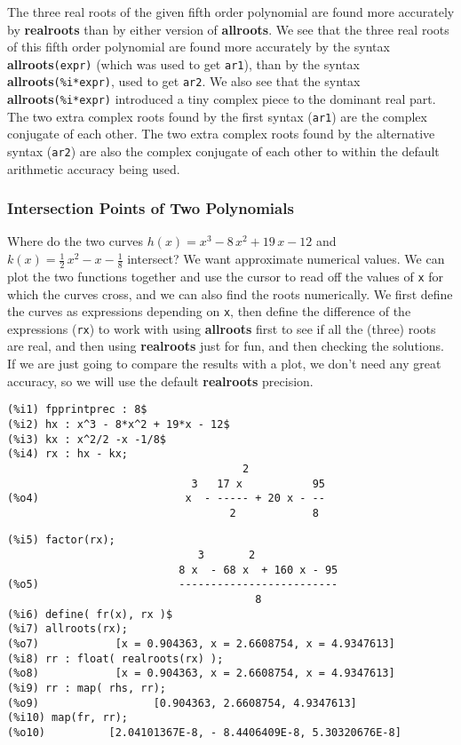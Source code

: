 \documentclass[12pt]{article}
\begin{document}
\normalsize
The three real roots of the given fifth order polynomial are
  found more accurately by \textbf{realroots} than by either
  version of \textbf{allroots}.
We see that the three real roots of this fifth order polynomial are found
  more accurately by the syntax \textbf{allroots}\verb|(expr)|  (which was used
  to get \verb|ar1|), than by the syntax \textbf{allroots}\verb|(%i*expr)|,
  used to get \verb|ar2|.
We also see that the syntax \textbf{allroots}\verb|(%i*expr)| introduced
  a tiny complex piece to the dominant real part.
The two extra complex roots found by the first syntax (\verb|ar1|) are the complex
 conjugate of each other.  
The two extra complex roots found by the alternative syntax (\verb|ar2|) are also
  the complex conjugate of each other to within the default arithmetic accuracy
  being used.
\subsubsection{Intersection Points of Two Polynomials}
Where do the two curves $h(x)=x^3-8\, x^2 + 19\, x -12$ and
  $k(x)=\frac{1}{2}\, x^2 -x - \frac{1}{8}$ intersect?
We want approximate numerical values.
We can plot the two functions together and use the cursor to read off the
  values of \verb|x| for which the curves cross, and we can also find the
  roots numerically.
We first define the curves as expressions depending on \verb|x|, then
  define the difference of the expressions (\verb|rx|) to work with using \textbf{allroots}
  first to see if all the (three) roots are real, and then using \textbf{realroots}
  just for fun, and then checking the solutions.  
If we are just going to compare the results with a plot, we don't need
  any great accuracy, so we will use the default \textbf{realroots} precision.
\small
\begin{verbatim}
(%i1) fpprintprec : 8$
(%i2) hx : x^3 - 8*x^2 + 19*x - 12$
(%i3) kx : x^2/2 -x -1/8$
(%i4) rx : hx - kx;
                                     2
                             3   17 x           95
(%o4)                       x  - ----- + 20 x - --
                                   2            8
\end{verbatim}
\newpage
\begin{verbatim}
(%i5) factor(rx);
                              3       2
                           8 x  - 68 x  + 160 x - 95
(%o5)                      -------------------------
                                       8
(%i6) define( fr(x), rx )$ 
(%i7) allroots(rx);
(%o7)            [x = 0.904363, x = 2.6608754, x = 4.9347613]
(%i8) rr : float( realroots(rx) );
(%o8)            [x = 0.904363, x = 2.6608754, x = 4.9347613]
(%i9) rr : map( rhs, rr);
(%o9)                  [0.904363, 2.6608754, 4.9347613]
(%i10) map(fr, rr);
(%o10)          [2.04101367E-8, - 8.4406409E-8, 5.30320676E-8]
\end{verbatim}
\end{document}
